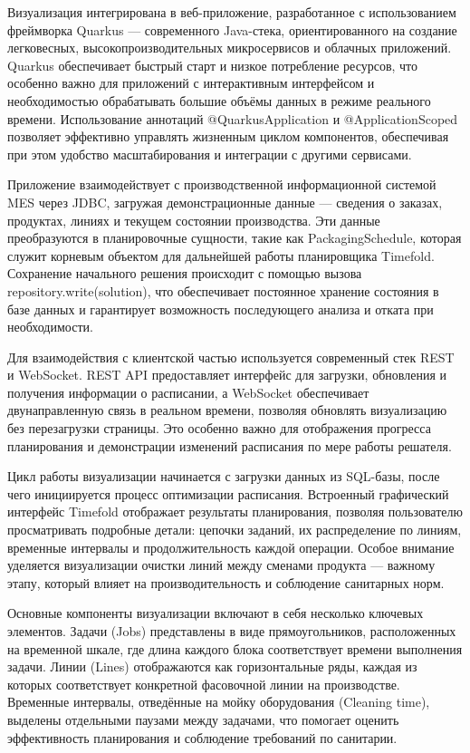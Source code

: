 Визуализация интегрирована в веб-приложение, разработанное с использованием фреймворка Quarkus — современного Java-стека, ориентированного на создание легковесных, высокопроизводительных микросервисов и облачных приложений. Quarkus обеспечивает быстрый старт и низкое потребление ресурсов, что особенно важно для приложений с интерактивным интерфейсом и необходимостью обрабатывать большие объёмы данных в режиме реального времени. Использование аннотаций @QuarkusApplication и @ApplicationScoped позволяет эффективно управлять жизненным циклом компонентов, обеспечивая при этом удобство масштабирования и интеграции с другими сервисами.

Приложение взаимодействует с производственной информационной системой MES через JDBC, загружая демонстрационные данные — сведения о заказах, продуктах, линиях и текущем состоянии производства. Эти данные преобразуются в планировочные сущности, такие как PackagingSchedule, которая служит корневым объектом для дальнейшей работы планировщика Timefold. Сохранение начального решения происходит с помощью вызова repository.write(solution), что обеспечивает постоянное хранение состояния в базе данных и гарантирует возможность последующего анализа и отката при необходимости.

Для взаимодействия с клиентской частью используется современный стек REST и WebSocket. REST API предоставляет интерфейс для загрузки, обновления и получения информации о расписании, а WebSocket обеспечивает двунаправленную связь в реальном времени, позволяя обновлять визуализацию без перезагрузки страницы. Это особенно важно для отображения прогресса планирования и демонстрации изменений расписания по мере работы решателя.

Цикл работы визуализации начинается с загрузки данных из SQL-базы, после чего инициируется процесс оптимизации расписания. Встроенный графический интерфейс Timefold отображает результаты планирования, позволяя пользователю просматривать подробные детали: цепочки заданий, их распределение по линиям, временные интервалы и продолжительность каждой операции. Особое внимание уделяется визуализации очистки линий между сменами продукта — важному этапу, который влияет на производительность и соблюдение санитарных норм.

Основные компоненты визуализации включают в себя несколько ключевых элементов. Задачи (Jobs) представлены в виде прямоугольников, расположенных на временной шкале, где длина каждого блока соответствует времени выполнения задачи. Линии (Lines) отображаются как горизонтальные ряды, каждая из которых соответствует конкретной фасовочной линии на производстве. Временные интервалы, отведённые на мойку оборудования (Cleaning time), выделены отдельными паузами между задачами, что помогает оценить эффективность планирования и соблюдение требований по санитарии.

